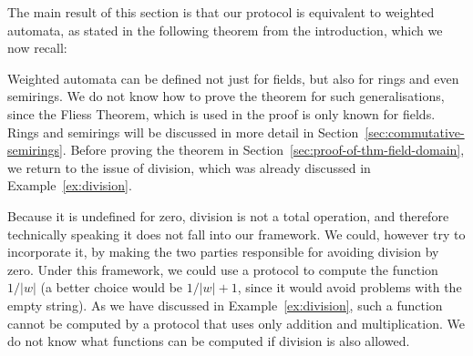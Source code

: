The main result of this section is that our protocol is equivalent to weighted automata, as stated in the following theorem from the introduction, which we now recall:
\fielddomain*


Weighted automata can be defined not just for fields, but also for rings and even semirings. We do not know how to prove the theorem for such generalisations, since the Fliess Theorem, which is used in the proof is only known for fields. Rings and semirings will be discussed in more detail in Section~\ref{sec:commutative-semirings}.
 Before proving the theorem in Section~\ref{sec:proof-of-thm-field-domain}, we return to the issue of division, which was already discussed in Example~\ref{ex:division}.

\begin{myexample}\label{ex:division-continued}
    Because it is undefined for zero, division is not a total operation, and therefore technically speaking it does not fall into our framework. We could, however try to incorporate it, by making the two parties responsible for avoiding division by zero. Under this framework, we could use a protocol to compute the function $1/|w|$ (a better choice would be $1/|w|+1$, since it would avoid problems with the empty string). As we have discussed in Example~\ref{ex:division}, such a function cannot be computed by a protocol that uses only addition and multiplication. We do not know what functions can be computed if division is also allowed.
\end{myexample}



